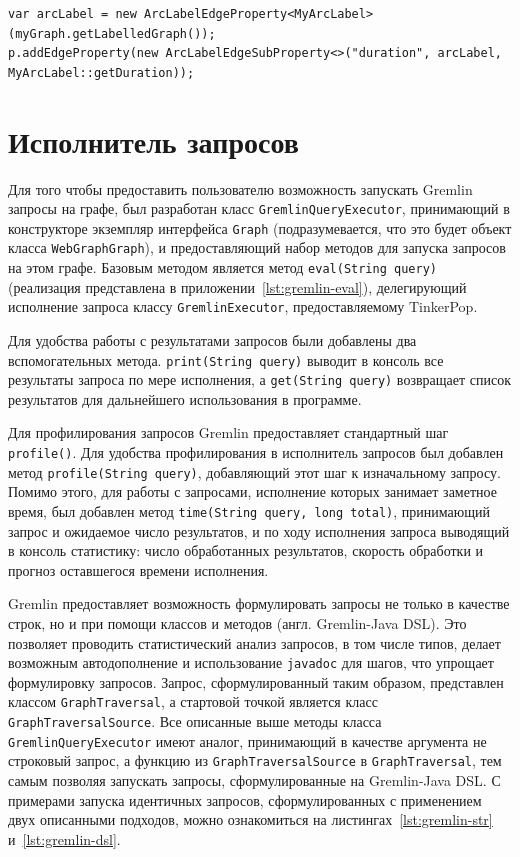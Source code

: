 \documentclass[times,specification,annotation]{itmo-student-thesis}
\begin{document}
\begin{lstlisting}[float=!h,caption={Пример декомпозиции метки},label={lst:arclabel}]
var arcLabel = new ArcLabelEdgeProperty<MyArcLabel>(myGraph.getLabelledGraph());
p.addEdgeProperty(new ArcLabelEdgeSubProperty<>("duration", arcLabel, MyArcLabel::getDuration));
\end{lstlisting}

\section{Исполнитель запросов}\label{sec:executor}

Для того чтобы предоставить пользователю возможность запускать Gremlin запросы на графе, был разработан класс \texttt{GremlinQueryExecutor}, принимающий в конструкторе экземпляр интерфейса \texttt{Graph} (подразумевается, что это будет объект класса \texttt{WebGraphGraph}), и предоставляющий набор методов для запуска запросов на этом графе. Базовым методом является метод \texttt{eval(String query)} (реализация представлена в приложении~\ref{lst:gremlin-eval}), делегирующий исполнение запроса классу \texttt{GremlinExecutor}, предоставляемому TinkerPop.

Для удобства работы с результатами запросов были добавлены два вспомогательных метода. \texttt{print(String query)} выводит в консоль все результаты запроса по мере исполнения, а \texttt{get(String query)} возвращает список результатов для дальнейшего использования в программе.

Для профилирования запросов Gremlin предоставляет стандартный шаг \texttt{profile()}. Для удобства профилирования в исполнитель запросов был добавлен метод \texttt{profile(String query)}, добавляющий этот шаг к изначальному запросу. Помимо этого, для работы с запросами, исполнение которых занимает заметное время, был добавлен метод \texttt{time(String query, long total)}, принимающий запрос и ожидаемое число результатов, и по ходу исполнения запроса выводящий в консоль статистику: число обработанных результатов, скорость обработки и прогноз оставшегося времени исполнения.

Gremlin предоставляет возможность формулировать запросы не только в качестве строк, но и при помощи классов и методов (англ. Gremlin-Java DSL). Это позволяет проводить статистический анализ запросов, в том числе типов, делает возможным автодополнение и использование \texttt{javadoc} для шагов, что упрощает формулировку запросов. Запрос, сформулированный таким образом, представлен классом \texttt{GraphTraversal}, а стартовой точкой является класс \texttt{GraphTraversalSource}. Все описанные выше методы класса \texttt{GremlinQueryExecutor} имеют аналог, принимающий в качестве аргумента не строковый запрос, а функцию из \texttt{GraphTraversalSource} в \texttt{GraphTraversal}, тем самым позволяя запускать запросы, сформулированные на Gremlin-Java DSL. С примерами запуска идентичных запросов, сформулированных с применением двух описанными подходов, можно ознакомиться на листингах~\ref{lst:gremlin-str} и~\ref{lst:gremlin-dsl}.
\end{document}
